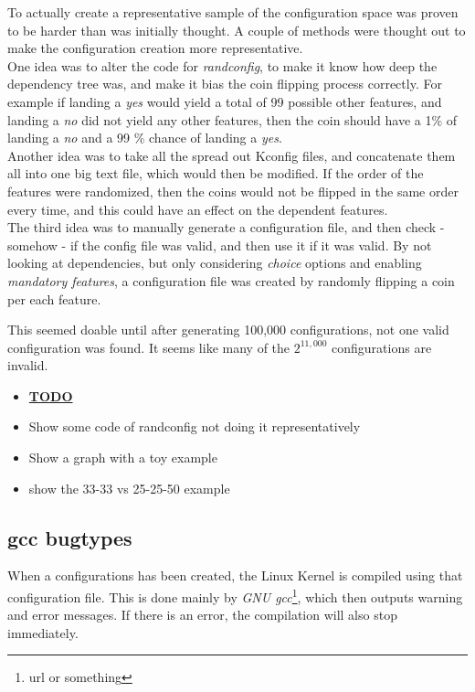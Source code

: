 \documentclass[a4paper,11pt]{article}
\begin{document}
To actually create a representative sample of the configuration space was 
proven to be harder than was initially thought. A couple of methods were 
thought out to make the configuration creation more representative. \\


One idea was to alter the code for \emph{randconfig}, to make it know how deep 
the dependency tree was, and make it bias the coin flipping process correctly. 
For example if landing a \emph{yes} would yield a total of 99 possible other 
features, and landing a \emph{no} did not yield any other features, then the 
coin should have a 1\% of landing a \emph{no} and a 99 \% chance of landing a 
\emph{yes}. \\


Another idea was to take all the spread out Kconfig files, and concatenate 
them all into one big text file, which would then be modified. If the order of 
the features were randomized, then the coins would not be flipped in the same 
order every time, and this could have an effect on the dependent features. \\

The third idea was to manually generate a configuration file, and then check - 
somehow - if the config file was valid, and then use it if it was valid. By 
not looking at dependencies, but only considering \emph{choice} options and 
enabling \emph{mandatory features}, a configuration file was created by 
randomly flipping a coin per each feature.

This seemed doable until after generating 100,000 configurations, not one 
valid configuration was found. It seems like many of the $2^{11,000}$ 
configurations are invalid.


\begin{itemize}
    \item \underline{\textbf{TODO}}
    \item Show some code of randconfig not doing it representatively
    \item Show a graph with a toy example
    \item show the 33-33 vs 25-25-50 example
\end{itemize}


\subsection{gcc bugtypes}

When a configurations has been created, the Linux Kernel is compiled using 
that configuration file. This is done mainly by \emph{GNU gcc}\footnote{url or 
something}, which then outputs warning and error messages. If there is an 
error, the compilation will also stop immediately.
\end{document}
